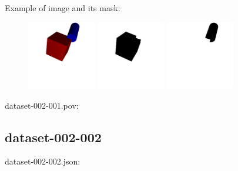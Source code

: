 Example of image and its mask:
\begin{center}
\begin{figure}[H]
\centering\includegraphics[width=3cm]{./img-002-001.png}
\centering\includegraphics[width=3cm]{./mask-002-001-000.png}
\centering\includegraphics[width=3cm]{./mask-002-001-001.png}
\end{figure}
\end{center}

dataset-002-001.pov:
\begin{scriptsize}
\begin{ttfamily}

\end{ttfamily}
\end{scriptsize}

\subsection{dataset-002-002}

dataset-002-002.json:
\begin{scriptsize}
\begin{ttfamily}

\end{ttfamily}
\end{scriptsize}

